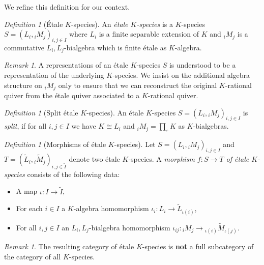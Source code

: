 \documentclass[a4paper,12pt,reqno]{amsart}
\theoremstyle{plain}
\theoremstyle{remark}
\newtheorem{remark}[theorem]{Remark}
\newtheorem{definition}[theorem]{Definition}
\begin{document}
  We refine this definition for our context.
  \begin{definition}[\'Etale $K$-species]
    An {\em \'etale $K$-species} is a $K$-species $S=(L_i,{}_iM_j)_{i,j\in I}$ where $L_i$ is a finite separable extension of $K$ and ${}_iM_j$ is a commutative $L_i,L_j$-bialgebra which is finite \'etale as $K$-algebra.
  \end{definition}
  
  \begin{remark}
    A representations of an \'etale $K$-species $S$ is understood to be a representation of the underlying $K$-species. We insist on the additional algebra structure on ${}_iM_j$ only to ensure that we can reconstruct the original $K$-rational quiver from the \'etale quiver associated to a $K$-rational quiver.
  \end{remark}

  \begin{definition}[Split \'etale $K$-species]
    An \'etale $K$-species $S=(L_i,{}_iM_j)_{i,j\in I}$ is {\em split}, if for all $i,j\in I$ we have $K\cong L_i$ and ${}_iM_j=\prod\limits_{\varepsilon} K$ as $K$-bialgebras.
  \end{definition}

  \begin{definition}[Morphisms of \'etale $K$-species]
    Let $S=(L_i,{}_iM_j)_{i,j\in I}$ and $T=(\widetilde{L}_i,{}_i\widetilde{M}_j)_{i,j\in \widetilde{I}}$ denote two \'etale $K$-species. A {\em morphism $f\colon S\to T$ of \'etale $K$-species} consists of the following data:
    \begin{itemize}
      \item[(i)] A map $\iota\colon I\to\widetilde{I}$,
      \item[(ii)] For each $i\in I$ a $K$-algebra homomorphism $\iota_i\colon L_i\to\widetilde{L}_{\iota(i)}$,
      \item[(iii)] For all $i,j\in I$ an $L_i,L_j$-bialgebra homomorphism $\iota_{ij}\colon {}_iM_j\to{}_{\iota(i)}\widetilde{M}_{\iota(j)}$.
    \end{itemize}
  \end{definition}

  \begin{remark}
    The resulting category of \'etale $K$-species is {\bf not} a full subcategory of the category of all $K$-species.
  \end{remark}
  
\end{document}
